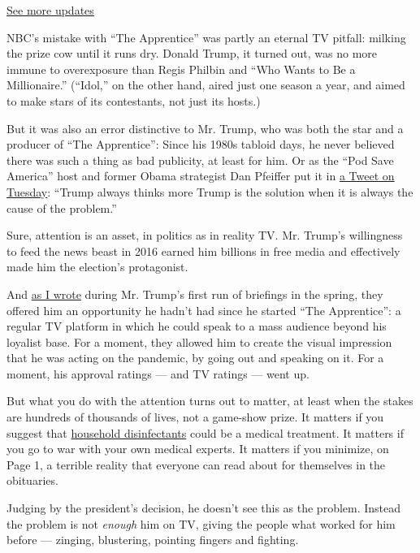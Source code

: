 \href{https://www.nytimes3xbfgragh.onion/2020/07/31/us/elections/biden-vs-trump.html?action=click\&pgtype=Article\&state=default\&region=MAIN_CONTENT_1\&context=storylines_live_updates}{See
more updates}

NBC's mistake with ``The Apprentice'' was partly an eternal TV pitfall:
milking the prize cow until it runs dry. Donald Trump, it turned out,
was no more immune to overexposure than Regis Philbin and ``Who Wants to
Be a Millionaire.'' (``Idol,'' on the other hand, aired just one season
a year, and aimed to make stars of its contestants, not just its hosts.)

But it was also an error distinctive to Mr. Trump, who was both the star
and a producer of ``The Apprentice'': Since his 1980s tabloid days, he
never believed there was such a thing as bad publicity, at least for
him. Or as the ``Pod Save America'' host and former Obama strategist Dan
Pfeiffer put it in
\href{https://twitter.com/danpfeiffer/status/1285241783937429505}{a
Tweet on Tuesday}: ``Trump always thinks more Trump is the solution when
it is always the cause of the problem.''

Sure, attention is an asset, in politics as in reality TV. Mr. Trump's
willingness to feed the news beast in 2016 earned him billions in free
media and effectively made him the election's protagonist.

And
\href{https://www.nytimes3xbfgragh.onion/2020/03/30/arts/television/trump-coronavirus-briefing.html}{as
I wrote} during Mr. Trump's first run of briefings in the spring, they
offered him an opportunity he hadn't had since he started ``The
Apprentice'': a regular TV platform in which he could speak to a mass
audience beyond his loyalist base. For a moment, they allowed him to
create the visual impression that he was acting on the pandemic, by
going out and speaking on it. For a moment, his approval ratings --- and
TV ratings --- went up.

But what you do with the attention turns out to matter, at least when
the stakes are hundreds of thousands of lives, not a game-show prize. It
matters if you suggest that
\href{https://www.nytimes3xbfgragh.onion/2020/04/24/us/politics/trump-inject-disinfectant-bleach-coronavirus.html}{household
disinfectants} could be a medical treatment. It matters if you go to war
with your own medical experts. It matters if you minimize, on Page 1, a
terrible reality that everyone can read about for themselves in the
obituaries.

Judging by the president's decision, he doesn't see this as the problem.
Instead the problem is not \emph{enough} him on TV, giving the people
what worked for him before --- zinging, blustering, pointing fingers and
fighting.

